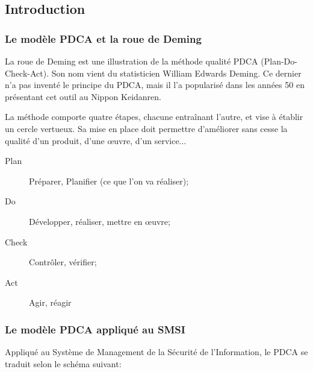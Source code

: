 \subsection{Introduction}

\subsubsection{Le modèle PDCA et la roue de Deming}

La roue de Deming est une illustration de la méthode qualité PDCA (Plan-Do-Check-Act). Son nom vient du statisticien William Edwards Deming. Ce dernier n'a pas inventé le principe du PDCA, mais il l'a popularisé dans les années 50 en présentant cet outil au Nippon Keidanren.

La méthode comporte quatre étapes, chacune entraînant l'autre, et vise à établir un cercle vertueux. Sa mise en place doit permettre d'améliorer sans cesse la qualité d'un produit, d'une œuvre, d'un service...

\begin{description}
	\item[Plan] Préparer, Planifier (ce que l'on va réaliser);
	\item[Do] Développer, réaliser, mettre en œuvre;
	\item[Check] Contrôler, vérifier;
	\item[Act] Agir, réagir
\end{description}

\subsubsection{Le modèle PDCA appliqué au SMSI}

Appliqué au Système de Management de la Sécurité de l'Information, le PDCA se traduit selon le schéma suivant:

